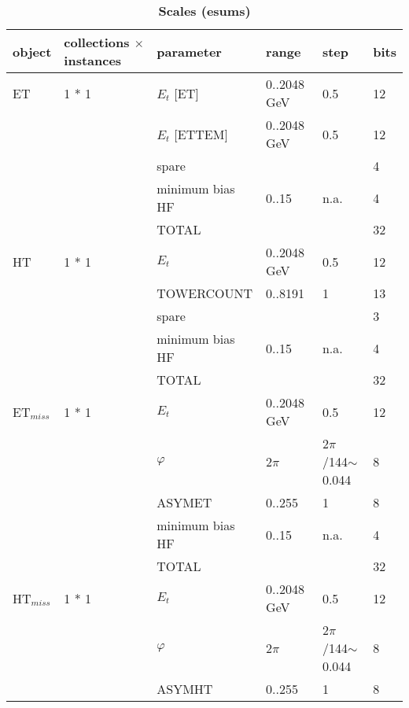 \documentclass{cmspaper}
\begin{document}
\begin{table}[ht]
\caption{\bf Scales (esums)}
\vspace{5mm}
\centering
\begin{tabular}{| l | l | l | l | l | l |}
\hline
object	&	collections $\times$ instances	&	parameter	&	range	&	step	&	bits \\
\hline\hline
ET	&	1 * 1	&	$E_t$ [ET]	&	0..2048 GeV	&	0.5	&	12                    \\
	&		&	$E_t$ [ETTEM]	&	0..2048 GeV	&	0.5	&	12                    \\
	&		&	spare	&		&		&	4                    \\
	&		&	minimum bias HF	&      0..15	&	n.a.	&	4                    \\
	&		&	TOTAL	&		&		&	32                    \\
\hline
HT	&	1 * 1	&	$E_t$	&	0..2048 GeV	&	0.5	&	12                    \\
	&		&	TOWERCOUNT	&	0..8191	&	1	&	13                    \\
	&		&	spare	&		&		&	3                    \\
	&		&	minimum bias HF	&      0..15	&	n.a.	&	4                    \\
	&		&	TOTAL	&		&		&	32                    \\
\hline
ET$_{miss}$    &   1 * 1   &   $E_t$   &   0..2048 GeV &   0.5 &   12                    \\
    &       &   $\varphi$   &   2$\pi$  &   2$\pi$/144$\sim$0.044   &   8                    \\
    &       &   ASYMET    &  0..255     &    1   &   8                    \\
    &       &   minimum bias HF &      0..15    &   n.a.    &   4                    \\
    &       &   TOTAL   &       &       &   32                    \\
\hline
HT$_{miss}$    &   1 * 1   &   $E_t$   &   0..2048 GeV &   0.5 &   12                    \\
    &       &   $\varphi$   &   2$\pi$  &   2$\pi$/144$\sim$0.044   &   8                    \\
    &       &   ASYMHT    &  0..255     &    1   &   8                    \\

\end{tabular}
\end{table}
\end{document}
